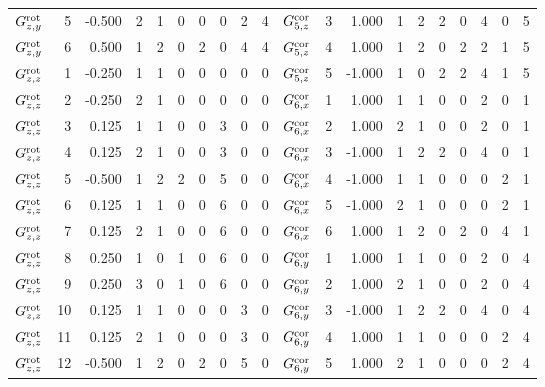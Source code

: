 \begin{tabular}{crrrrrrrrrcrrrrrrrrr}
$ G^{\rm rot}_{  z  ,y  }  $&     5  & -0.500 & 2 & 1 & 0 & 0 & 0 & 2 & 4 &     $    G^{\rm cor}_{5, z}  $&  3  &  1.000 & 1 & 2 & 2 & 0 & 4 & 0 & 5\\
$ G^{\rm rot}_{  z  ,y  }  $&     6  &  0.500 & 1 & 2 & 0 & 2 & 0 & 4 & 4 &     $    G^{\rm cor}_{5, z}  $&  4  &  1.000 & 1 & 2 & 0 & 2 & 2 & 1 & 5\\
$ G^{\rm rot}_{  z  ,z  }  $&     1  & -0.250 & 1 & 1 & 0 & 0 & 0 & 0 & 0 &     $    G^{\rm cor}_{5, z}  $&  5  & -1.000 & 1 & 0 & 2 & 2 & 4 & 1 & 5\\
$ G^{\rm rot}_{  z  ,z  }  $&     2  & -0.250 & 2 & 1 & 0 & 0 & 0 & 0 & 0 &     $    G^{\rm cor}_{6, x}  $&  1  &  1.000 & 1 & 1 & 0 & 0 & 2 & 0 & 1\\
$ G^{\rm rot}_{  z  ,z  }  $&     3  &  0.125 & 1 & 1 & 0 & 0 & 3 & 0 & 0 &     $    G^{\rm cor}_{6, x}  $&  2  &  1.000 & 2 & 1 & 0 & 0 & 2 & 0 & 1\\
$ G^{\rm rot}_{  z  ,z  }  $&     4  &  0.125 & 2 & 1 & 0 & 0 & 3 & 0 & 0 &     $    G^{\rm cor}_{6, x}  $&  3  & -1.000 & 1 & 2 & 2 & 0 & 4 & 0 & 1\\
$ G^{\rm rot}_{  z  ,z  }  $&     5  & -0.500 & 1 & 2 & 2 & 0 & 5 & 0 & 0 &     $    G^{\rm cor}_{6, x}  $&  4  & -1.000 & 1 & 1 & 0 & 0 & 0 & 2 & 1\\
$ G^{\rm rot}_{  z  ,z  }  $&     6  &  0.125 & 1 & 1 & 0 & 0 & 6 & 0 & 0 &     $    G^{\rm cor}_{6, x}  $&  5  & -1.000 & 2 & 1 & 0 & 0 & 0 & 2 & 1\\
$ G^{\rm rot}_{  z  ,z  }  $&     7  &  0.125 & 2 & 1 & 0 & 0 & 6 & 0 & 0 &     $    G^{\rm cor}_{6, x}  $&  6  &  1.000 & 1 & 2 & 0 & 2 & 0 & 4 & 1\\
$ G^{\rm rot}_{  z  ,z  }  $&     8  &  0.250 & 1 & 0 & 1 & 0 & 6 & 0 & 0 &     $    G^{\rm cor}_{6, y}  $&  1  &  1.000 & 1 & 1 & 0 & 0 & 2 & 0 & 4\\
$ G^{\rm rot}_{  z  ,z  }  $&     9  &  0.250 & 3 & 0 & 1 & 0 & 6 & 0 & 0 &     $    G^{\rm cor}_{6, y}  $&  2  &  1.000 & 2 & 1 & 0 & 0 & 2 & 0 & 4\\
$ G^{\rm rot}_{  z  ,z  }  $&    10  &  0.125 & 1 & 1 & 0 & 0 & 0 & 3 & 0 &     $    G^{\rm cor}_{6, y}  $&  3  & -1.000 & 1 & 2 & 2 & 0 & 4 & 0 & 4\\
$ G^{\rm rot}_{  z  ,z  }  $&    11  &  0.125 & 2 & 1 & 0 & 0 & 0 & 3 & 0 &     $    G^{\rm cor}_{6, y}  $&  4  &  1.000 & 1 & 1 & 0 & 0 & 0 & 2 & 4\\
$ G^{\rm rot}_{  z  ,z  }  $&    12  & -0.500 & 1 & 2 & 0 & 2 & 0 & 5 & 0 &     $    G^{\rm cor}_{6, y}  $&  5  &  1.000 & 2 & 1 & 0 & 0 & 0 & 2 & 4\\

\end{tabular}
